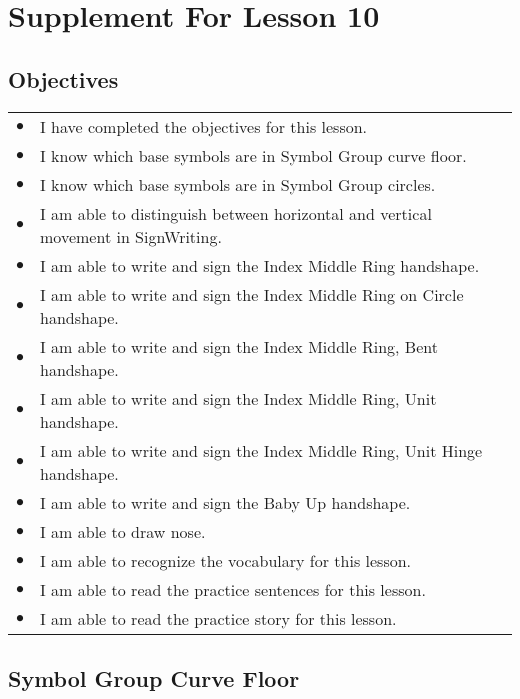 \documentclass{article}
\begin{document}
\newfontfamily{}
\newfontfamily{}
\newcommand{\bul}{\hfil$\bullet$&}
\renewenvironment{glossary}{\begin{multicols}{5}\begin{center}}{\end{center}\end{multicols}}
\setcounter{secnumdepth}{0}
\setlength{\columnseprule}{1pt}

\section{Supplement For Lesson 10}

\subsection{Objectives}

\begin{tabular}{p{1cm}p{14cm}}
\bul I have completed the objectives for this lesson.\\
\bul I know which base symbols are in Symbol Group curve floor.\\
\bul I know which base symbols are in Symbol Group circles.\\
\bul I am able to distinguish between horizontal and vertical movement in SignWriting.\\
\bul I am able to write and sign the Index Middle Ring handshape.\\
\bul I am able to write and sign the Index Middle Ring on Circle handshape.\\
\bul I am able to write and sign the Index Middle Ring, Bent handshape.\\
\bul I am able to write and sign the Index Middle Ring, Unit handshape.\\
\bul I am able to write and sign the Index Middle Ring, Unit Hinge handshape.\\
\bul I am able to write and sign the Baby Up handshape.\\
\bul I am able to draw nose.\\
\bul I am able to recognize the vocabulary for this lesson.\\
\bul I am able to read the practice sentences for this lesson.\\
\bul I am able to read the practice story for this lesson.\\
\end{tabular}

\subsection{Symbol Group Curve Floor}
\end{document}
